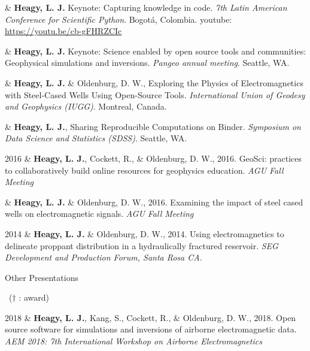 \documentclass[a4paper, 11pt]{article}
\newcommand{\youtube}[1]{youtube: \href{https://youtu.be/XY3Tq9Wd1\_A}{#1}}
\newcommand{\subheading}[1]{
    \vspace{0.4cm}
    {\Large #1}\\
    \vspace{-0.2cm}
}
\begin{document}
\begin{entryright}
& \textbf{Heagy, L. J.} Keynote: Capturing knowledge in code. \emph{7th Latin American Conference for Scientific Python}. Bogot\'a, Colombia. \youtube{https://youtu.be/cb-gFHRZCIc}
\end{entryright}

\begin{entryright}
& \textbf{Heagy, L. J.} Keynote: Science enabled by open source tools and communities: Geophysical simulations and inversions. \emph{Pangeo annual meeting}. Seattle, WA.
\end{entryright}

\begin{entryright}
& \textbf{Heagy, L. J.} \& Oldenburg, D. W., Exploring the Physics of Electromagnetics with Steel-Cased Wells Using Open-Source Tools. \emph{International Union of Geodesy and Geophysics (IUGG)}. Montreal, Canada.
\end{entryright}

\begin{entryright}
&  \textbf{Heagy, L. J.}, Sharing Reproducible Computations on Binder. \emph{Symposium on Data Science and Statistics (SDSS)}. Seattle, WA.
\end{entryright}


\begin{entryright}
2016 & \textbf{Heagy, L. J.}, Cockett, R., \& Oldenburg, D. W., 2016. GeoSci: practices to collaboratively build online resources for geophysics education. \emph{AGU Fall Meeting}
\end{entryright}

\begin{entryright}
& \textbf{Heagy, L. J.} \& Oldenburg, D. W., 2016. Examining the impact of steel cased wells on electromagnetic signals. \emph{AGU Fall Meeting}
\end{entryright}


\begin{entryright}
2014 & \textbf{Heagy, L. J.} \& Oldenburg, D. W., 2014. Using electromagnetics to delineate proppant distribution in a hydraulically fractured reservoir. \emph{SEG Development and Production Forum, Santa Rosa CA}.
\end{entryright}

\subheading{Other Presentations}
\vspace{0.3cm}
~($\dagger$ : award)
\vspace{0.3cm}
\begin{entryright}
2018 & \textbf{Heagy, L. J.}, Kang, S., Cockett, R., \& Oldenburg, D. W., 2018. Open source software for simulations and inversions of airborne electromagnetic data. \emph{AEM 2018: 7th International Workshop on Airborne Electromagnetics}
\end{entryright}
\end{document}

